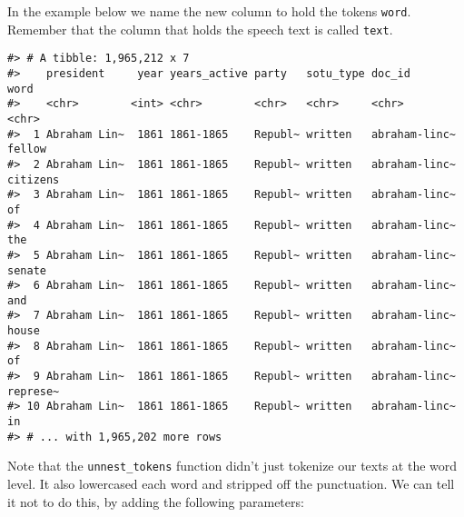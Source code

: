 \documentclass[]{book}
\newenvironment{Shaded}{\begin{snugshade}}{\end{snugshade}}
\newcommand{\CommentTok}[1]{\textcolor[rgb]{0.56,0.35,0.01}{\textit{#1}}}
\newcommand{\DataTypeTok}[1]{\textcolor[rgb]{0.13,0.29,0.53}{#1}}
\newcommand{\KeywordTok}[1]{\textcolor[rgb]{0.13,0.29,0.53}{\textbf{#1}}}
\newcommand{\NormalTok}[1]{#1}
\newcommand{\OperatorTok}[1]{\textcolor[rgb]{0.81,0.36,0.00}{\textbf{#1}}}
\newcommand{\OtherTok}[1]{\textcolor[rgb]{0.56,0.35,0.01}{#1}}
\newcommand{\StringTok}[1]{\textcolor[rgb]{0.31,0.60,0.02}{#1}}
\begin{document}
In the example below we name the new column to hold the tokens \texttt{word}. Remember that the column that holds the speech text is called \texttt{text}.

\begin{Shaded}
\end{Shaded}

\begin{verbatim}
#> # A tibble: 1,965,212 x 7
#>    president     year years_active party   sotu_type doc_id        word    
#>    <chr>        <int> <chr>        <chr>   <chr>     <chr>         <chr>   
#>  1 Abraham Lin~  1861 1861-1865    Republ~ written   abraham-linc~ fellow  
#>  2 Abraham Lin~  1861 1861-1865    Republ~ written   abraham-linc~ citizens
#>  3 Abraham Lin~  1861 1861-1865    Republ~ written   abraham-linc~ of      
#>  4 Abraham Lin~  1861 1861-1865    Republ~ written   abraham-linc~ the     
#>  5 Abraham Lin~  1861 1861-1865    Republ~ written   abraham-linc~ senate  
#>  6 Abraham Lin~  1861 1861-1865    Republ~ written   abraham-linc~ and     
#>  7 Abraham Lin~  1861 1861-1865    Republ~ written   abraham-linc~ house   
#>  8 Abraham Lin~  1861 1861-1865    Republ~ written   abraham-linc~ of      
#>  9 Abraham Lin~  1861 1861-1865    Republ~ written   abraham-linc~ represe~
#> 10 Abraham Lin~  1861 1861-1865    Republ~ written   abraham-linc~ in      
#> # ... with 1,965,202 more rows
\end{verbatim}

Note that the \texttt{unnest\_tokens} function didn't just tokenize our texts at the word level. It also lowercased each word and stripped off the punctuation. We can tell it not to do this, by adding the following parameters:

\begin{Shaded}
\end{Shaded}
\end{document}
